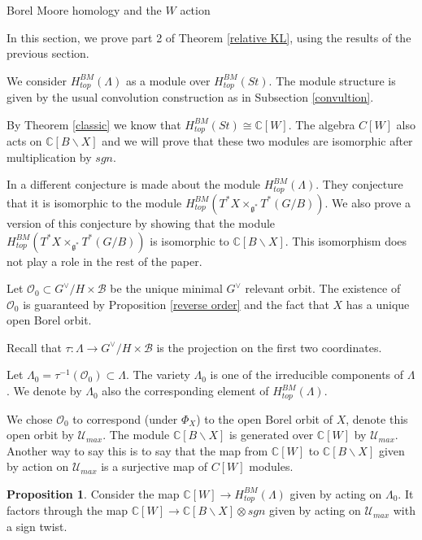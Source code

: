 \documentclass[12pt]{article}
\newcommand{\B}{\mathcal{B}}
\newcommand{\C}{\mathbb{C}}
\newcommand{\s}{\mathcal{O}}
\newcommand{\<}{\langle}
\renewcommand{\>}{\rangle}
\theoremstyle{plain}
\theoremstyle{definition}
\newtheorem{prop}[theorem]{Proposition}
\begin{document}
\begin{section}{Borel Moore homology and the $W$ action}\label{s4}

In this section, we prove part 2 of Theorem \ref{relative KL}, using the results of the previous section.

We consider $H_{top}^{BM}(\Lambda)$ as a module over $H_{top}^{BM}(St)$. The module structure is given by the usual convolution construction as in Subsection \ref{convultion}. 

By Theorem \ref{classic} we know that $H_{top}^{BM}(St)\cong \C[W]$. The algebra $C[W]$ also acts on $\C[B\backslash X]$ and we will prove that these two modules are isomorphic after multiplication by $sgn$. 

In \cite{finkelberg2023lagrangiansubvarietieshypersphericalvarieties} a different conjecture is made about the module $H_{top}^{BM}(\Lambda)$. They conjecture that it is isomorphic to the module $H_{top}^{BM}(T^*X\times_{\mathfrak{g}^{*}}T^*(G/B))$. We also prove a version of this conjecture by showing that the module $H_{top}^{BM}(T^*X\times_{\mathfrak{g}^{*}}T^*(G/B))$ is isomorphic to $\C[B\backslash X]$. This isomorphism does  not play a role in the rest of the paper.

Let $\s_0\subset G^\vee/H\times \B$ be the unique minimal $G^\vee$ relevant orbit. The existence of $\s_0$ is guaranteed by Proposition \ref{reverse order} and the fact that $X$ has a unique open Borel orbit.

Recall that $\tau:\Lambda\rightarrow G^\vee/H\times \B$ is the projection on the first two coordinates. 

Let $\Lambda_0=\tau^{-1}(\s_0)\subset \Lambda$. The variety $\Lambda_0$ is one of the irreducible components of $\Lambda$. We denote by $\Lambda_0$ also the corresponding element of $H_{top}^{BM}(\Lambda)$.

We chose $\s_0$ to correspond (under $\Phi_X$) to the open Borel orbit of $X$, denote this open orbit by $\mathcal{U}_{max}$. The module $\C[B\backslash X]$ is generated over $\C[W]$ by $\mathcal{U}_{max}$. Another way to say this is to say that the map from $\C[W]$ to $\C[B\backslash X]$ given by action on  $\mathcal{U}_{max}$ is a surjective map of $C[W]$ modules.

\begin{prop}\label{map BM}
    Consider the map $\C[W]\rightarrow H_{top}^{BM}(\Lambda)$ given by acting on $\Lambda_0$. It factors through the map $\C[W]\rightarrow \C[B\backslash X]\otimes sgn$ given by acting on $\mathcal{U}_{max}$ with a sign twist. 
\end{prop}


\end{section}
\end{document}
